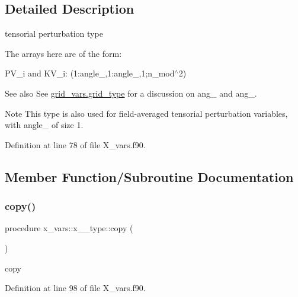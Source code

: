 \subsection{Detailed Description}
tensorial perturbation type 

The arrays here are of the form\+:
\begin{DoxyItemize}
\item {\ttfamily P\+V\+\_\+i} and K\+V\+\_\+i\+: {\ttfamily (1\+:angle\+\_,1\+:angle\+\_,1;n\+\_\+mod$^\wedge$2)}
\end{DoxyItemize}

\begin{DoxySeeAlso}{See also}
See \hyperlink{structgrid__vars_1_1grid__type}{grid\+\_\+vars.\+grid\+\_\+type} for a discussion on {\ttfamily ang\+\_} and {\ttfamily ang\+\_}.
\end{DoxySeeAlso}
\begin{DoxyNote}{Note}
This type is also used for field-\/averaged tensorial perturbation variables, with {\ttfamily angle\+\_} of size 1. 
\end{DoxyNote}


Definition at line 78 of file X\+\_\+vars.\+f90.



\subsection{Member Function/\+Subroutine Documentation}
\mbox{\label{structx__vars_1_1x__2__type_ae52df438c7be00a5cfe07c58ffe637d1}} 
\subsubsection{\texorpdfstring{copy()}{copy()}}
{\footnotesize\ttfamily procedure x\+\_\+vars\+::x\+\_\+\_\+type\+::copy (\begin{DoxyParamCaption}{ }\end{DoxyParamCaption})}



copy 



Definition at line 98 of file X\+\_\+vars.\+f90.

\mbox{\label{structx__vars_1_1x__2__type_a085972ba0d2b6930a028164cc42e1cec}} 
